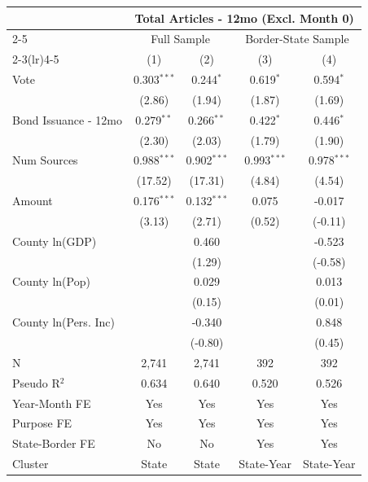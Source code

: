\begingroup
\centering
\begin{tabular*}{\textwidth}{@{\extracolsep{\fill}}lcccc}
   \toprule
    & \multicolumn{4}{c}{Total Articles - 12mo (Excl. Month 0)}\\
   \cmidrule(lr){2-5}
    & \multicolumn{2}{c}{Full Sample} & \multicolumn{2}{c}{Border-State Sample}\\
   \cmidrule(lr){2-3}\cmidrule(lr){4-5}
                        & (1)           & (2)           & (3)           & (4)\\  
   \midrule 
   Vote                 & 0.303$^{***}$ & 0.244$^{*}$   & 0.619$^{*}$   & 0.594$^{*}$\\   
                        & (2.86)       & (1.94)       & (1.87)       & (1.69)\\   
   Bond Issuance - 12mo & 0.279$^{**}$  & 0.266$^{**}$  & 0.422$^{*}$   & 0.446$^{*}$\\   
                        & (2.30)       & (2.03)       & (1.79)       & (1.90)\\   
   Num Sources          & 0.988$^{***}$ & 0.902$^{***}$ & 0.993$^{***}$ & 0.978$^{***}$\\   
                        & (17.52)      & (17.31)      & (4.84)       & (4.54)\\   
   Amount               & 0.176$^{***}$ & 0.132$^{***}$ & 0.075         & -0.017\\   
                        & (3.13)       & (2.71)       & (0.52)       & (-0.11)\\   
   County ln(GDP)       &               & 0.460         &               & -0.523\\   
                        &               & (1.29)       &               & (-0.58)\\   
   County ln(Pop)       &               & 0.029         &               & 0.013\\   
                        &               & (0.15)       &               & (0.01)\\   
   County ln(Pers. Inc) &               & -0.340        &               & 0.848\\   
                        &               & (-0.80)      &               & (0.45)\\   
   \hline
   N         & 2,741         & 2,741         & 392           & 392\\  
   Pseudo R$^2$         & 0.634         & 0.640         & 0.520         & 0.526\\  
   Year-Month FE        & Yes           & Yes           & Yes           & Yes\\  
   Purpose FE           & Yes           & Yes           & Yes           & Yes\\  
   State-Border FE      & No            & No            & Yes           & Yes\\  
   Cluster              & State & State & State-Year & State-Year\\  
   \bottomrule
\end{tabular*}
\par\endgroup
